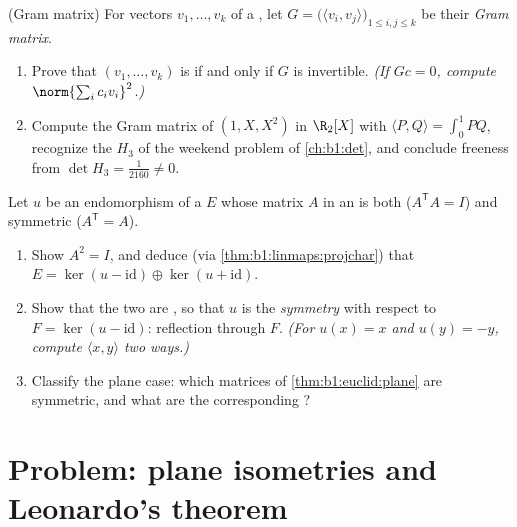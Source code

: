 \begin{exercise}[$\star\star$]\label{exo:b1:euclid:11}
(Gram matrix) For vectors $v_1, \dots, v_k$ of a , let $G = \bigl(\langle v_i, v_j\rangle\bigr)_{1 \leq i, j
\leq k}$ be their \emph{Gram matrix}.
\begin{enumerate}
  \item Prove that $(v_1, \dots, v_k)$ is  if and only if
        $G$ is invertible. \emph{(If $Gc = 0$, compute
        $\norm{\sum_i c_i v_i}^2$.)}
  \item Compute the Gram matrix of $(1, X, X^2)$ in $\R_2[X]$
        with $\langle P, Q\rangle = \int_0^1 PQ$, recognize the
         $H_3$ of the weekend problem of
        \cref{ch:b1:det}, and conclude freeness from $\det H_3 =
        \frac1{2160} \neq 0$.
\end{enumerate}
\end{exercise}

\begin{exercise}[$\star\star\star$]\label{exo:b1:euclid:12}
Let $u$ be an endomorphism of a  $E$ whose matrix
$A$ in an   is both  ($A^{\mathsf T}A
= I$) and symmetric ($A^{\mathsf T} = A$).
\begin{enumerate}
  \item Show $A^2 = I$, and deduce (via
        \cref{thm:b1:linmaps:projchar}) that $E = \ker(u -
        \mathrm{id}) \oplus \ker(u + \mathrm{id})$.
  \item Show that the two  are , so that $u$
        is the \emph{ symmetry} with respect to $F =
        \ker(u - \mathrm{id})$: reflection through $F$.
        \emph{(For $u(x) = x$ and $u(y) = -y$, compute $\langle
        x, y\rangle$ two ways.)}
  \item Classify the plane case: which matrices of
        \cref{thm:b1:euclid:plane} are symmetric, and what are
        the corresponding ?
\end{enumerate}
\end{exercise}

\section{Problem: plane isometries and Leonardo's theorem}

